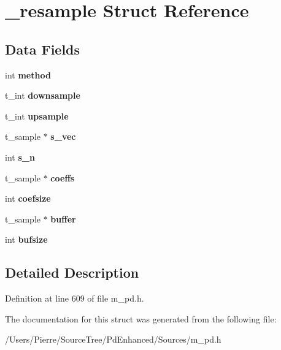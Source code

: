 \hypertarget{struct__resample}{\section{\-\_\-resample Struct Reference}
\label{struct__resample}
}
\subsection*{Data Fields}
\begin{DoxyCompactItemize}
\item 
\hypertarget{struct__resample_adcc9a19ad3119f823a658f6a49a24e64}{int {\bfseries method}}\label{struct__resample_adcc9a19ad3119f823a658f6a49a24e64}

\item 
\hypertarget{struct__resample_a557c02564a918ab46f10edfd7cf58c49}{t\-\_\-int {\bfseries downsample}}\label{struct__resample_a557c02564a918ab46f10edfd7cf58c49}

\item 
\hypertarget{struct__resample_a8bd5117088d2fe0f7feca9bee53ca183}{t\-\_\-int {\bfseries upsample}}\label{struct__resample_a8bd5117088d2fe0f7feca9bee53ca183}

\item 
\hypertarget{struct__resample_ad4ecec8b90444188a47a8cde0babc5ae}{t\-\_\-sample $\ast$ {\bfseries s\-\_\-vec}}\label{struct__resample_ad4ecec8b90444188a47a8cde0babc5ae}

\item 
\hypertarget{struct__resample_aee0a45e5329caef59b617145b09fc3fa}{int {\bfseries s\-\_\-n}}\label{struct__resample_aee0a45e5329caef59b617145b09fc3fa}

\item 
\hypertarget{struct__resample_a9c34ce6a37c6273044bd148d1b7e6298}{t\-\_\-sample $\ast$ {\bfseries coeffs}}\label{struct__resample_a9c34ce6a37c6273044bd148d1b7e6298}

\item 
\hypertarget{struct__resample_a8ebe6d92ebeffa641883431e18e5fe2b}{int {\bfseries coefsize}}\label{struct__resample_a8ebe6d92ebeffa641883431e18e5fe2b}

\item 
\hypertarget{struct__resample_ad3f952f1432d55dde1e47bf4ed4296fb}{t\-\_\-sample $\ast$ {\bfseries buffer}}\label{struct__resample_ad3f952f1432d55dde1e47bf4ed4296fb}

\item 
\hypertarget{struct__resample_a199ab88d4ca8eab30e1cb7d35edacca5}{int {\bfseries bufsize}}\label{struct__resample_a199ab88d4ca8eab30e1cb7d35edacca5}

\end{DoxyCompactItemize}


\subsection{Detailed Description}


Definition at line 609 of file m\-\_\-pd.\-h.



The documentation for this struct was generated from the following file\-:\begin{DoxyCompactItemize}
\item 
/\-Users/\-Pierre/\-Source\-Tree/\-Pd\-Enhanced/\-Sources/m\-\_\-pd.\-h\end{DoxyCompactItemize}
